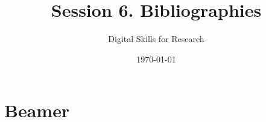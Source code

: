 \documentclass[a4paper,11pt]{article}
\title{Session 6. Bibliographies}
\author{Digital Skills for Research}
\date{\today}
\begin{document}
\maketitle
\tableofcontents

\section{Beamer}

\section{}

\section{}
\end{document}
